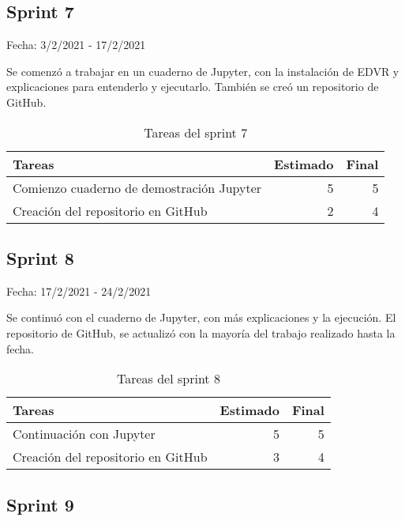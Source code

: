 \subsection{Sprint 7}

    Fecha: 3/2/2021 - 17/2/2021
    
    Se comenzó a trabajar en un cuaderno de Jupyter, con la instalación de EDVR y explicaciones para entenderlo y ejecutarlo. También se creó un repositorio de GitHub.
    
    \begin{table}[H]
    	 \begin{tabularx}{\linewidth}{X r r}
    	 	\toprule \textbf{Tareas} & \textbf{Estimado} & \textbf{Final}\\
    	 	\toprule
         	Comienzo cuaderno de demostración Jupyter  & 5 & 5 \\
        	Creación del repositorio en GitHub & 2 & 4 \\
    	 	\bottomrule
    	 \end{tabularx}
    	 \caption{Tareas del sprint 7}
    \end{table}

\subsection{Sprint 8}

    Fecha: 17/2/2021 - 24/2/2021
    
    Se continuó con el cuaderno de Jupyter, con más explicaciones y la ejecución. El repositorio de GitHub, se actualizó con la mayoría del trabajo realizado hasta la fecha.
    
    \begin{table}[H]
    	 \begin{tabularx}{\linewidth}{X r r}
    	 	\toprule \textbf{Tareas} & \textbf{Estimado} & \textbf{Final}\\
    	 	\toprule
         	Continuación con Jupyter  & 5 & 5 \\
	        Creación del repositorio en GitHub & 3 & 4 \\
    	 	\bottomrule
    	 \end{tabularx}
    	 \caption{Tareas del sprint 8}
    \end{table}

\subsection{Sprint 9}
    
